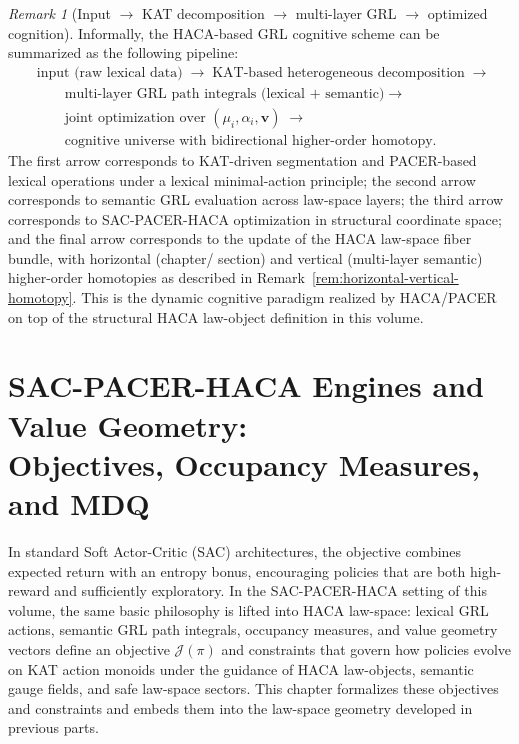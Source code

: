 \documentclass[11pt]{book}
\theoremstyle{plain}
\theoremstyle{definition}
\theoremstyle{remark}
\newtheorem{remark}[theorem]{Remark}
\begin{document}
\begin{remark}[Input $\to$ KAT decomposition $\to$ multi-layer GRL $\to$ optimized cognition]
\label{rem:haca-grl-cognitive-scheme-summary}
Informally, the HACA-based GRL cognitive scheme can be summarized as
the following pipeline:
\[
\begin{aligned}
  &\text{input (raw lexical data)}
    \;\longrightarrow\;
    \text{KAT-based heterogeneous decomposition}
    \;\longrightarrow\;\\
  &\qquad\text{multi-layer GRL path integrals (lexical + semantic)}
    \;\longrightarrow\;\\
  &\qquad\text{joint optimization over }(\mu_i,\alpha_i,\mathbf{v})
    \;\longrightarrow\;\\
  &\qquad\text{cognitive universe with bidirectional higher-order homotopy}.
\end{aligned}
\]
The first arrow corresponds to KAT-driven segmentation and PACER-based
lexical operations under a lexical minimal-action principle; the
second arrow corresponds to semantic GRL evaluation across law-space
layers; the third arrow corresponds to SAC-PACER-HACA optimization in
structural coordinate space; and the final arrow corresponds to the
update of the HACA law-space fiber bundle, with horizontal (chapter/
section) and vertical (multi-layer semantic) higher-order homotopies
as described in Remark~\ref{rem:horizontal-vertical-homotopy}. This is
the dynamic cognitive paradigm realized by HACA/PACER on top of the
structural HACA law-object definition in this volume.
\end{remark}

\chapter[SAC-PACER-HACA Engines and Value Geometry]{SAC-PACER-HACA Engines and Value Geometry:\\
         Objectives, Occupancy Measures, and MDQ}


In standard Soft Actor-Critic (SAC) architectures, the objective
combines expected return with an entropy bonus, encouraging policies
that are both high-reward and sufficiently exploratory. In the
SAC-PACER-HACA setting of this volume, the same basic philosophy is
lifted into HACA law-space: lexical GRL actions, semantic GRL path
integrals, occupancy measures, and value geometry vectors define an
objective $\mathcal{J}(\pi)$ and constraints that govern how policies
evolve on KAT action monoids under the guidance of HACA law-objects,
semantic gauge fields, and safe law-space sectors. This chapter
formalizes these objectives and constraints and embeds them into the
law-space geometry developed in previous parts.
\end{document}
